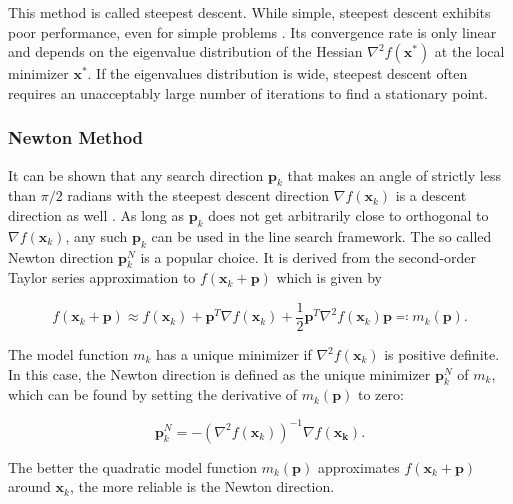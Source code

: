 \noindent This method is called steepest descent. While simple, steepest descent exhibits poor performance, even for simple problems \cite{nocedal2006}. 
Its convergence rate is only linear and depends on the eigenvalue distribution of the Hessian $\nabla^2 f(\bm{x}^*)$ at the local minimizer
$\bm{x}^*$. If the eigenvalues distribution is wide, steepest descent often requires an unacceptably large number of iterations to find a 
stationary point.

\subsubsection{Newton Method}\label{sss:newton-method}
It can be shown that any search direction $\bm{p}_k$ that makes an angle of strictly less than $\pi/2$ radians with the steepest descent
direction $\nabla f(\bm{x}_k)$ is a descent direction as well \cite{nocedal2006}. As long as $\bm{p}_k$ does not get arbitrarily close to 
orthogonal to $\nabla f(\bm{x}_k)$, any such $\bm{p}_k$ can be used in the line search framework. The so called Newton direction $\bm{p}^N_k$ 
is a popular choice. It is derived from the second-order Taylor series approximation to $f(\bm{x}_k + \bm{p})$ which is given by

\begin{equation}\label{eq:newton-model}
    f(\bm{x}_k + \bm{p}) \approx f(\bm{x}_k) + \bm{p}^T \nabla f(\bm{x}_k) + \frac{1}{2}\bm{p}^T \nabla^2 f(\bm{x}_k) \bm{p} \eqqcolon 
    m_k(\bm{p}).
\end{equation}

\noindent The model function $m_k$ has a unique minimizer if $\nabla^2 f(\bm{x}_k)$ is positive definite. In this case, the Newton direction 
is defined
as the unique minimizer $\bm{p}^N_k$ of $m_k$, which can be found by setting the derivative of $m_k(\bm{p})$ to zero:

\begin{equation}\label{eq:newton-diretion}
    \bm{p}^N_k = - (\nabla^2 f(\bm{x}_k))^{-1} \nabla f(\bm{x_k}).
\end{equation}

\noindent The better the quadratic model function $m_k(\bm{p})$ approximates $f(\bm{x}_k + \bm{p})$ around $\bm{x}_k$, the more reliable is the 
Newton direction. 

